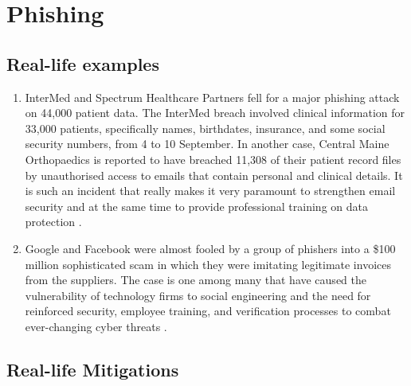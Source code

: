 \section{Phishing}

\subsection{Real-life examples}

\begin{enumerate}
    \item InterMed and Spectrum Healthcare Partners fell for a major phishing attack on 44,000 patient data. The InterMed breach involved clinical information for 33,000 patients, specifically names, birthdates, insurance, and some social security numbers, from 4 to 10 September. In another case, Central Maine Orthopaedics is reported to have breached 11,308 of their patient record files by unauthorised access to emails that contain personal and clinical details. It is such an incident that really makes it very paramount to strengthen email security and at the same time to provide professional training on data protection \cite{HIPAAJournal2020Phishing} .
    \item Google and Facebook were almost fooled by a group of phishers into a \$100 million sophisticated scam in which they were imitating legitimate invoices from the suppliers. The case is one among many that have caused the vulnerability of technology firms to social engineering and the need for reinforced security, employee training, and verification processes to combat ever-changing cyber threats \cite{CNBC2019Phishing}.
\end{enumerate}

\subsection{Real-life Mitigations} 

